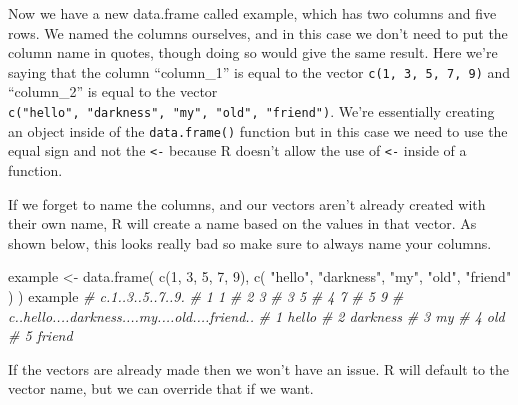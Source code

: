 \documentclass[
  a4paper,
]{krantz}
\makeatletter
\newenvironment{Shaded}{\begin{snugshade}}{\end{snugshade}}
\newcommand{\CommentTok}[1]{\textcolor[rgb]{0.56,0.35,0.01}{\textit{#1}}}
\newcommand{\DecValTok}[1]{\textcolor[rgb]{0.00,0.00,0.81}{#1}}
\newcommand{\FunctionTok}[1]{\textcolor[rgb]{0.00,0.00,0.00}{#1}}
\newcommand{\NormalTok}[1]{#1}
\newcommand{\OtherTok}[1]{\textcolor[rgb]{0.56,0.35,0.01}{#1}}
\newcommand{\StringTok}[1]{\textcolor[rgb]{0.31,0.60,0.02}{#1}}
\newenvironment{kframe}{%
\medskip{}
\setlength{\fboxsep}{.8em}
 \def\at@end@of@kframe{}%
 \ifinner\ifhmode%
  \def\at@end@of@kframe{\end{minipage}}%
  \begin{minipage}{\columnwidth}%
 \fi\fi%
 \def\FrameCommand##1{\hskip\@totalleftmargin \hskip-\fboxsep
 \colorbox{shadecolor}{##1}\hskip-\fboxsep
     \hskip-\linewidth \hskip-\@totalleftmargin \hskip\columnwidth}%
 \MakeFramed {\advance\hsize-\width
   \@totalleftmargin\z@ \linewidth\hsize
   \@setminipage}}%
 {\par\unskip\endMakeFramed%
 \at@end@of@kframe}
\renewenvironment{Shaded}{\begin{kframe}}{\end{kframe}}
\makeatother
\begin{document}
Now we have a new data.frame called example, which has two
columns and five rows. We named the columns ourselves, and
in this case we don't need to put the column name in quotes,
though doing so would give the same result. Here we're
saying that the column ``column\_1'' is equal to the vector
\texttt{c(1,\ 3,\ 5,\ 7,\ 9)} and ``column\_2'' is equal to
the vector
\texttt{c("hello",\ "darkness",\ "my",\ "old",\ "friend")}.
We're essentially creating an object inside of the
\texttt{data.frame()} function but in this case we need to
use the equal sign and not the \texttt{\textless{}-} because
R doesn't allow the use of \texttt{\textless{}-} inside of a
function.

If we forget to name the columns, and our vectors aren't
already created with their own name, R will create a name
based on the values in that vector. As shown below, this
looks really bad so make sure to always name your columns.

\begin{Shaded}
\begin{Highlighting}[]
\NormalTok{example }\OtherTok{\textless{}{-}} \FunctionTok{data.frame}\NormalTok{(}
  \FunctionTok{c}\NormalTok{(}\DecValTok{1}\NormalTok{, }\DecValTok{3}\NormalTok{, }\DecValTok{5}\NormalTok{, }\DecValTok{7}\NormalTok{, }\DecValTok{9}\NormalTok{),}
  \FunctionTok{c}\NormalTok{(}
    \StringTok{"hello"}\NormalTok{,}
    \StringTok{"darkness"}\NormalTok{,}
    \StringTok{"my"}\NormalTok{,}
    \StringTok{"old"}\NormalTok{,}
    \StringTok{"friend"}
\NormalTok{  )}
\NormalTok{)}
\NormalTok{example}
\CommentTok{\#   c.1..3..5..7..9.}
\CommentTok{\# 1                1}
\CommentTok{\# 2                3}
\CommentTok{\# 3                5}
\CommentTok{\# 4                7}
\CommentTok{\# 5                9}
\CommentTok{\#   c..hello....darkness....my....old....friend..}
\CommentTok{\# 1                                         hello}
\CommentTok{\# 2                                      darkness}
\CommentTok{\# 3                                            my}
\CommentTok{\# 4                                           old}
\CommentTok{\# 5                                        friend}
\end{Highlighting}
\end{Shaded}

If the vectors are already made then we won't have an issue.
R will default to the vector name, but we can override that
if we want.
\end{document}
